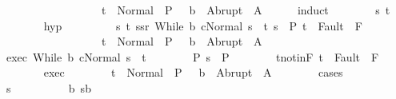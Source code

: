 \begin{isabellebody}
\ \ \ \ \ \ \ \ \ \ \ \ \ \ \ \ \ {\isasymLongrightarrow}\ t\ {\isasymin}\ Normal\ {\isacharbackquote}\ {\isacharparenleft}P\ {\isasyminter}\ {\isacharminus}\ b{\isacharparenright}\ {\isasymunion}\ Abrupt\ {\isacharbackquote}\ A{\isachardoublequoteclose}\isanewline
\ \ \ \ \isamarkupfalse%
\ {\isacharparenleft}induct{\isacharparenright}\isanewline
\ \ \ \ \ \ \isamarkupfalse%
\ s\ t\isanewline
\ \ \ \ \ \ \isamarkupfalse%
\ hyp{\isacharcolon}\ \isanewline
\ \ \ \ \ \ \ \ {\isachardoublequoteopen}{\isasymAnd}s{\isacharprime}\ t{\isachardot}\ {\isasymlbrakk}{\isacharparenleft}s{\isacharprime}{\isacharcomma}s{\isacharparenright}{\isasymin}r{\isacharsemicolon}\ {\isasymGamma}{\isasymturnstile}{\isasymlangle}While\ b\ c{\isacharcomma}Normal\ s{\isacharprime}{\isasymrangle}\ {\isasymRightarrow}\ t{\isacharsemicolon}\ s{\isacharprime}\ {\isasymin}\ P{\isacharsemicolon}\ t\ {\isasymnotin}\ Fault\ {\isacharbackquote}\ F{\isasymrbrakk}\isanewline
\ \ \ \ \ \ \ \ \ \ \ \ \ \ \ \ \ {\isasymLongrightarrow}\ t\ {\isasymin}\ Normal\ {\isacharbackquote}\ {\isacharparenleft}P\ {\isasyminter}\ {\isacharminus}\ b{\isacharparenright}\ {\isasymunion}\ Abrupt\ {\isacharbackquote}\ A{\isachardoublequoteclose}\isanewline
\ \ \ \ \ \ \isamarkupfalse%
\ exec{\isacharcolon}\ {\isachardoublequoteopen}{\isasymGamma}{\isasymturnstile}{\isasymlangle}While\ b\ c{\isacharcomma}Normal\ s{\isasymrangle}\ {\isasymRightarrow}\ t{\isachardoublequoteclose}\isanewline
\ \ \ \ \ \ \isamarkupfalse%
\ P{\isacharcolon}\ {\isachardoublequoteopen}s\ {\isasymin}\ P{\isachardoublequoteclose}\isanewline
\ \ \ \ \ \ \isamarkupfalse%
\ t{\isacharunderscore}notin{\isacharunderscore}F{\isacharcolon}\ {\isachardoublequoteopen}t\ {\isasymnotin}\ Fault\ {\isacharbackquote}\ F{\isachardoublequoteclose}\isanewline
\ \ \ \ \ \ \isamarkupfalse%
\ exec\isanewline
\ \ \ \ \ \ \isamarkupfalse%
\ {\isachardoublequoteopen}t\ {\isasymin}\ Normal\ {\isacharbackquote}\ {\isacharparenleft}P\ {\isasyminter}\ {\isacharminus}\ b{\isacharparenright}\ {\isasymunion}\ Abrupt\ {\isacharbackquote}\ A{\isachardoublequoteclose}\isanewline
\ \ \ \ \ \ \isamarkupfalse%
\ {\isacharparenleft}cases{\isacharparenright}\isanewline
\ \ \ \ \ \ \ \ \isamarkupfalse%
\ s{\isacharprime}\isanewline
\ \ \ \ \ \ \ \ \isamarkupfalse%
\ b{\isacharcolon}\ {\isachardoublequoteopen}s{\isasymin}b{\isachardoublequoteclose}\isanewline
\ \ \ \ \ \ \ \ \isamarkupfalse%

\end{isabellebody}
